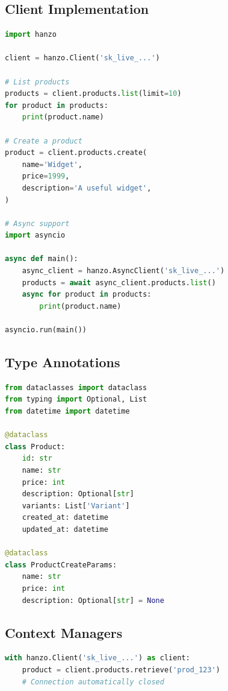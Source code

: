 \documentclass[11pt,a4paper]{article}
\begin{document}
\subsection{Client Implementation}

\begin{lstlisting}[language=Python, caption=Python Client]
import hanzo

client = hanzo.Client('sk_live_...')

# List products
products = client.products.list(limit=10)
for product in products:
    print(product.name)

# Create a product
product = client.products.create(
    name='Widget',
    price=1999,
    description='A useful widget',
)

# Async support
import asyncio

async def main():
    async_client = hanzo.AsyncClient('sk_live_...')
    products = await async_client.products.list()
    async for product in products:
        print(product.name)

asyncio.run(main())
\end{lstlisting}

\subsection{Type Annotations}

\begin{lstlisting}[language=Python, caption=Python Type Annotations]
from dataclasses import dataclass
from typing import Optional, List
from datetime import datetime

@dataclass
class Product:
    id: str
    name: str
    price: int
    description: Optional[str]
    variants: List['Variant']
    created_at: datetime
    updated_at: datetime

@dataclass
class ProductCreateParams:
    name: str
    price: int
    description: Optional[str] = None
\end{lstlisting}

\subsection{Context Managers}

\begin{lstlisting}[language=Python, caption=Python Context Manager]
with hanzo.Client('sk_live_...') as client:
    product = client.products.retrieve('prod_123')
    # Connection automatically closed
\end{lstlisting}
\end{document}
